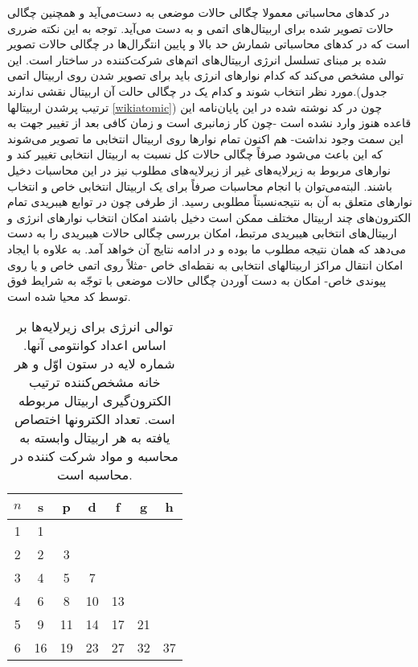 در کدهای محاسباتی معمولا چگالی حالات موضعی به دست‌می‌آید و همچنین چگالی حالات تصویر شده  برای 
اربیتال‌های اتمی  و  به دست می‌آید. توجه به این نکته ضرری است که در کدهای محاسباتی شمارش 
حد بالا و پایین انتگرال‌ها در چگالی حالات تصویر شده بر مبنای تسلسل انرژی اربیتال‌های اتم‌های شرکت‌کننده در 
ساختار است. این توالی مشخص می‌کند که کدام نوارهای انرژی باید برای تصویر شدن روی اربیتال اتمی مورد نظر 
انتخاب شوند و کدام یک در چگالی حالت آن اربیتال نقشی ندارند.(جدول ترتیب پرشدن اربیتالها \ref{wikiatomic}) 
چون در کد نوشته شده در این پایان‌نامه این قاعده هنوز وارد نشده است -چون کار زمانبری است و زمان کافی بعد 
از تغییر جهت به این سمت وجود نداشت- هم اکنون تمام نوارها روی اربیتال انتخابی ما تصویر می‌شوند که این باعث 
می‌شود صرفاً چگالی حالات کل نسبت  به اربیتال انتخابی تغییر کند و نوارهای مربوط به زیرلایه‌های غیر از 
زیرلایه‌های مطلوب نیز در این محاسبات دخیل باشند. البته‌می‌توان با انجام محاسبات صرفاً برای یک اربیتال 
انتخابی خاص و انتخاب نوارهای متعلق به آن به نتیجه‌نسبتاً مطلوبی رسید. از طرفی چون در توابع هیبریدی تمام 
الکترون‌های چند اربیتال مختلف ممکن است دخیل باشند امکان انتخاب نوارهای انرژی و اربیتال‌های انتخابی هیبریدی 
مرتبط، امکان بررسی چگالی حالات هیبریدی را به دست می‌دهد که همان نتیجه مطلوب ما بوده و در ادامه نتایج آن 
خواهد آمد. به علاوه با ایجاد امکان انتقال مراکز اربیتالهای انتخابی به نقطه‌ای خاص -مثلاً روی اتمی خاص و یا 
روی پیوندی خاص- امکان به دست آوردن چگالی حالات موضعی با توجّه به شرایط فوق توسط کد  محیا 
شده است.
\begin{table}
\renewcommand{\arraystretch}{0.4}
\begin{center}
 \begin{tabular}{|c||c|c|c|c|c|c|}
 \hline
$n$  & s & p & d & f & g & h \\
\hline\hline
1     & 1&  &  &  &  &   \\
\hline
2    & 2 &3 &   &  &  &  \\
\hline
3     & 4 &5 & 7 &  &  &  \\
\hline
4     & 6 & 8 & 10 & 13 &  &  \\
\hline
5     & 9 & 11 & 14 & 17 &21 &  \\
\hline
6     &16 & 19 & 23 & 27 & 32 & 37 \\
\hline
\end{tabular}
\caption{ 
توالی انرژی برای زیرلایه‌ها بر اساس اعداد کوانتومی آنها. شماره لایه در ستون اوّل و هر خانه مشخص‌کننده ترتیب الکترون‌گیری اربیتال مربوطه است. تعداد الکترونها اختصاص یافته به هر اربیتال وابسته به محاسبه و مواد شرکت کننده در محاسبه است.\cite{wikiatomic}
}
\end{center}
\end{table}
